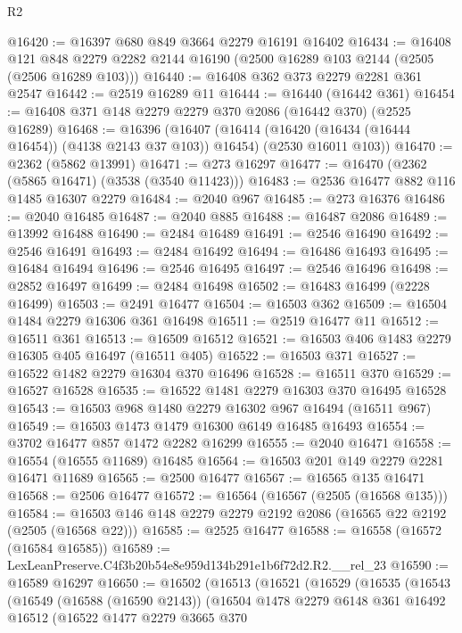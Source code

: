 \begin{lexlean}{R2}
\begin{coremodule}
@16420 := @16397 @680 @849 @3664 @2279 @16191 @16402
@16434 := @16408
    @121
    @848
    @2279
    @2282
    @2144
    @16190
    (@2500 @16289 @103 @2144 (@2505 (@2506 @16289 @103)))
@16440 := @16408 @362 @373 @2279 @2281 @361 @2547
@16442 := @2519 @16289 @11
@16444 := @16440 (@16442 @361)
@16454 := @16408 @371 @148 @2279 @2279 @370 @2086 (@16442 @370) (@2525 @16289)
@16468 := @16396
    (@16407
      (@16414 (@16420 (@16434 (@16444 @16454)) (@4138 @2143 @37 @103)) @16454)
      (@2530 @16011 @103))
@16470 := @2362 (@5862 @13991)
@16471 := @273 @16297
@16477 := @16470 (@2362 (@5865 @16471) (@3538 (@3540 @11423)))
@16483 := @2536 @16477 @882 @116 @1485 @16307 @2279
@16484 := @2040 @967
@16485 := @273 @16376
@16486 := @2040 @16485
@16487 := @2040 @885
@16488 := @16487 @2086
@16489 := @13992 @16488
@16490 := @2484 @16489
@16491 := @2546 @16490
@16492 := @2546 @16491
@16493 := @2484 @16492
@16494 := @16486 @16493
@16495 := @16484 @16494
@16496 := @2546 @16495
@16497 := @2546 @16496
@16498 := @2852 @16497
@16499 := @2484 @16498
@16502 := @16483 @16499 (@2228 @16499)
@16503 := @2491 @16477
@16504 := @16503 @362
@16509 := @16504 @1484 @2279 @16306 @361 @16498
@16511 := @2519 @16477 @11
@16512 := @16511 @361
@16513 := @16509 @16512
@16521 := @16503 @406 @1483 @2279 @16305 @405 @16497 (@16511 @405)
@16522 := @16503 @371
@16527 := @16522 @1482 @2279 @16304 @370 @16496
@16528 := @16511 @370
@16529 := @16527 @16528
@16535 := @16522 @1481 @2279 @16303 @370 @16495 @16528
@16543 := @16503 @968 @1480 @2279 @16302 @967 @16494 (@16511 @967)
@16549 := @16503 @1473 @1479 @16300 @6149 @16485 @16493
@16554 := @3702 @16477 @857 @1472 @2282 @16299
@16555 := @2040 @16471
@16558 := @16554 (@16555 @11689) @16485
@16564 := @16503 @201 @149 @2279 @2281 @16471 @11689
@16565 := @2500 @16477
@16567 := @16565 @135 @16471
@16568 := @2506 @16477
@16572 := @16564 (@16567 (@2505 (@16568 @135)))
@16584 := @16503 @146 @148 @2279 @2279 @2192 @2086 (@16565 @22 @2192 (@2505 (@16568 @22)))
@16585 := @2525 @16477
@16588 := @16558 (@16572 (@16584 @16585))
@16589 := LexLeanPreserve.C4f3b20b54e8e959d134b291e1b6f72d2.R2.__rel_23
@16590 := @16589 @16297
@16650 := @16502
    (@16513
      (@16521
        (@16529
          (@16535
            (@16543
              (@16549
                (@16588 (@16590 @2143))
                (@16504
                  @1478
                  @2279
                  @6148
                  @361
                  @16492
                  @16512
                  (@16522
                    @1477
                    @2279
                    @3665
                    @370

\end{coremodule}
\end{lexlean}
